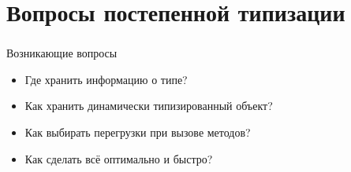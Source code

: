\documentclass[t]{beamer}  %
\begin{document}






\section{Вопросы постепенной типизации}
\begin{frame}
	\frametitle{\insertsection} 
    \begin{block}{Возникающие вопросы}
		\begin{itemize}
          \item Где хранить информацию о типе?
          \item Как хранить динамически типизированный объект?
          \item Как выбирать перегрузки при вызове методов?
          \item Как сделать всё оптимально и быстро?
		\end{itemize}
	\end{block}
\end{frame}
\end{document}
